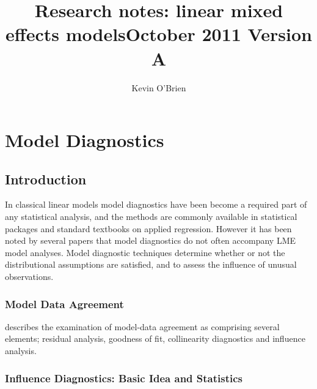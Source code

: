 \documentclass[12pt, a4paper]{report}
\title{Research notes: linear mixed effects models}
\author{ } \date{ }
\theoremstyle{plain}
\theoremstyle{definition}
\theoremstyle{remark}
\begin{document}
\author{Kevin O'Brien}
\title{October 2011 Version A}




\chapter{Model Diagnostics}
\section{Introduction}%
In classical linear models model diagnostics have been become a required part of any statistical analysis, and the methods are commonly available in statistical packages and standard textbooks on applied regression. However it has been noted by several papers that model diagnostics do not often accompany LME model analyses.
Model diagnostic techniques determine whether or not the distributional assumptions are satisfied, and to assess the influence of unusual observations.

\subsection{Model Data Agreement} %
\citet{schabenberger} describes the examination of model-data agreement as comprising several elements; residual analysis, goodness of fit, collinearity diagnostics and influence analysis.

\subsection{Influence Diagnostics: Basic Idea and Statistics} %
\end{document}
